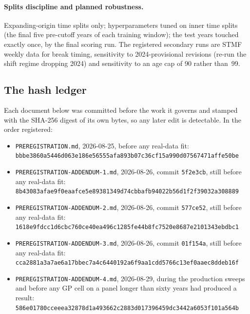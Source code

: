 \paragraph{Splits discipline and planned robustness.} Expanding-origin time
splits only; hyperparameters tuned on inner time splits (the final five
pre-cutoff years of each training window); the test years touched exactly
once, by the final scoring run. The registered secondary runs are STMF weekly
data for break timing, sensitivity to 2024-provisional revisions (re-run the
shift regime dropping 2024) and sensitivity to an age cap of 90 rather
than~99.

\subsection{The hash ledger}
\label{supp:prereg-hashes}

Each document below was committed before the work it governs and stamped with
the SHA-256 digest of its own bytes, so any later edit is detectable. In the
order registered:

\begin{itemize}
\item \texttt{PREREGISTRATION.md}, 2026-08-25, before any real-data fit:\\
  \texttt{\small bbbe3860a5446d063e186e56555afa893b07c36cf15a990d07567471affe50be}
\item \texttt{PREREGISTRATION-ADDENDUM-1.md}, 2026-08-26, commit
  \texttt{5f2e3cb}, still before any real-data fit:\\
  \texttt{\small 8b43083afae9f0eaafce5e89381349d74cbbafb94022b56d1f2f39032a308889}
\item \texttt{PREREGISTRATION-ADDENDUM-2.md}, 2026-08-26, commit
  \texttt{577ce52}, still before any real-data fit:\\
  \texttt{\small 1618e9fdcc1d6cbc760ce40ea496c1285fe44b8fc7520e8687e2101343ebdbc1}
\item \texttt{PREREGISTRATION-ADDENDUM-3.md}, 2026-08-26, commit
  \texttt{01f154a}, still before any real-data fit:\\
  \texttt{\small cca2881a3a7ae6a17bbec7a4c6440192a6f9aa1cdd5766c13ef0aaec8ddeb16f}
\item \texttt{PREREGISTRATION-ADDENDUM-4.md}, 2026-08-29, during the
  production sweeps and before any GP cell on a panel longer than sixty years
  had produced a result:\\
  \texttt{\small 586e01780cceeea32878d1a493662c2883d017396459dc3442a6053f101a564b}
\end{itemize}

